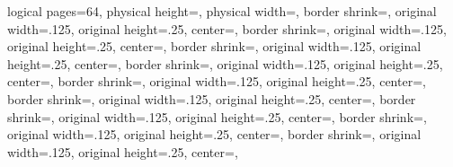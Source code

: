%
%
%
%
%
%

{%
	\edef\pgfpageoptionheight{\the\paperheight}%
	\edef\pgfpageoptionwidth{\the\paperwidth}%
	\edef\pgfpageoptionborder{1pt}%
}%
{
  \pgfpagesphysicalpageoptions%
  {%
    logical pages=64,%
    physical height=\pgfpageoptionheight,%
    physical width=\pgfpageoptionwidth,%
  }%
%
%
  {%
    border shrink=\pgfpageoptionborder,%
    original width=.125\pgfpageoptionheight,%
    original height=.25\pgfpageoptionwidth,%
	center=\pgfpoint{0pt}{\pgfphysicalheight},%
  }%
  {%
    border shrink=\pgfpageoptionborder,%
    original width=.125\pgfpageoptionheight,%
    original height=.25\pgfpageoptionwidth,%
	center=\pgfpoint{.25\pgfphysicalwidth}{\pgfphysicalheight},%
  }%
  {%
    border shrink=\pgfpageoptionborder,%
    original width=.125\pgfpageoptionheight,%
    original height=.25\pgfpageoptionwidth,%
	center=\pgfpoint{.5\pgfphysicalwidth}{\pgfphysicalheight},%
  }%
  {%
    border shrink=\pgfpageoptionborder,%
    original width=.125\pgfpageoptionheight,%
    original height=.25\pgfpageoptionwidth,%
	center=\pgfpoint{.75\pgfphysicalwidth}{\pgfphysicalheight},%
  }%
  {%
  	border shrink=\pgfpageoptionborder,%
  	original width=.125\pgfpageoptionheight,%
  	original height=.25\pgfpageoptionwidth,%
	center=\pgfpoint{0pt}{.875\pgfphysicalheight},%
  }%
  {%
	border shrink=\pgfpageoptionborder,%
	original width=.125\pgfpageoptionheight,%
	original height=.25\pgfpageoptionwidth,%
	center=\pgfpoint{.25\pgfphysicalwidth}{.875\pgfphysicalheight},%
  }%
  {%
	border shrink=\pgfpageoptionborder,%
	original width=.125\pgfpageoptionheight,%
	original height=.25\pgfpageoptionwidth,%
	center=\pgfpoint{.5\pgfphysicalwidth}{.875\pgfphysicalheight},%
  }%
  {%
  	border shrink=\pgfpageoptionborder,%
  	original width=.125\pgfpageoptionheight,%
  	original height=.25\pgfpageoptionwidth,%
	center=\pgfpoint{.75\pgfphysicalwidth}{.875\pgfphysicalheight},%
  }%
%
%
%
{%
	border shrink=\pgfpageoptionborder,%
	original width=.125\pgfpageoptionheight,%
	original height=.25\pgfpageoptionwidth,%
	center=\pgfpoint{0pt}{.75\pgfphysicalheight},%
}}
